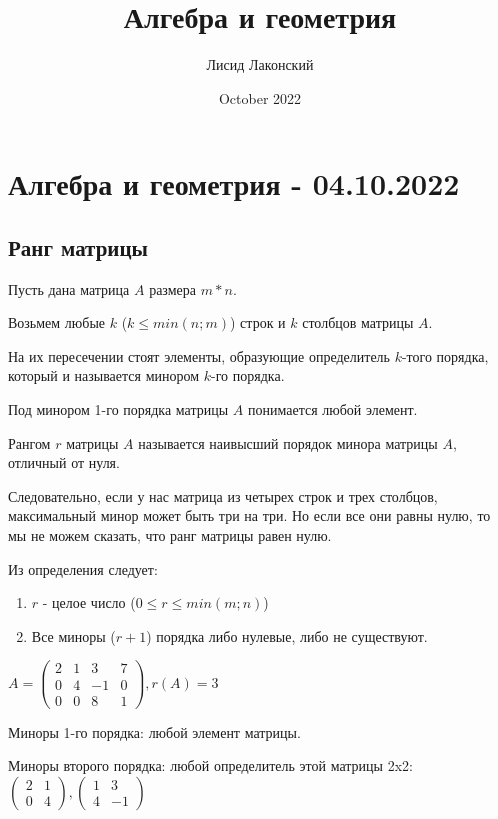 \documentclass{article}
\title{Алгебра и геометрия}
\author{Лисид Лаконский}
\date{October 2022}
\begin{document}
\maketitle

\section{Алгебра и геометрия - 04.10.2022}

\subsection{Ранг матрицы}

Пусть дана матрица $A$ размера $m * n$.

Возьмем любые $k$ ($k \le min(n;m)$) строк и $k$ столбцов матрицы $A$.

На их пересечении стоят элементы, образующие определитель $k$-того порядка, который и называется минором $k$-го порядка.

Под минором 1-го порядка матрицы $A$ понимается любой элемент.

Рангом $r$ матрицы $A$ называется наивысший порядок минора матрицы $A$, отличный от нуля.

Следовательно, если у нас матрица из четырех строк и трех столбцов, максимальный минор может быть три на три. Но если все они равны нулю, то мы не можем сказать, что ранг матрицы равен нулю.

Из определения следует:

\begin{enumerate}
    \item $r$ - целое число ($0 \le r \le min(m;n)$)
    \item Все миноры ($r + 1$) порядка либо нулевые, либо не существуют. 
\end{enumerate}

$A = \begin{pmatrix}
    2 & 1 & 3 & 7 \\
    0 & 4 & -1 & 0 \\
    0 & 0 & 8 & 1
\end{pmatrix}, r(A) = 3$

Миноры 1-го порядка: любой элемент матрицы. 

Миноры второго порядка: любой определитель этой матрицы 2x2: $\begin{pmatrix} 2 & 1 \\ 0 & 4 \end{pmatrix}, \begin{pmatrix} 1 & 3 \\ 4 & -1 \end{pmatrix}$
\end{document}

